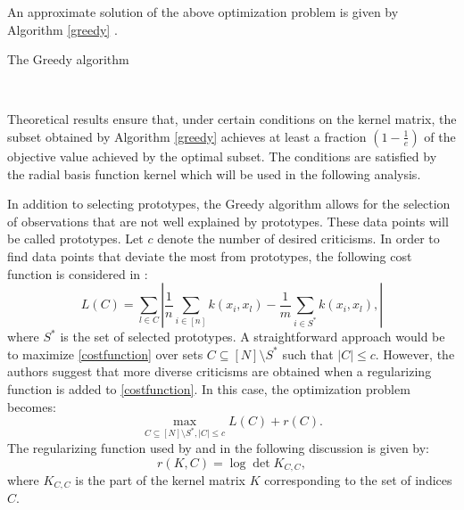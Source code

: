 \documentclass{article}
\begin{document}
	
	An approximate solution of the above optimization problem is given by Algorithm \ref{greedy} .
	
	\begin{algorithm}
		\caption{The Greedy algorithm }\label{greedy}
		\begin{algorithmic}[1]
			\EndFor
			\EndWhile \\
		\end{algorithmic}
	\end{algorithm}
	
	Theoretical results \cite{nemhauser1978analysis} ensure that, under certain conditions on the kernel matrix, the subset obtained by Algorithm \ref{greedy} achieves at least a fraction $(1-\frac{1}{e})$ of the objective value achieved by the optimal subset. The conditions are satisfied by the radial basis function kernel which will be used in the following analysis.
	
	In addition to selecting prototypes, the Greedy algorithm allows for the selection of observations that are not well explained by prototypes. These data points will be called prototypes. Let $c$ denote the number of desired criticisms. In order to find data points that deviate the most from prototypes, the following cost function is   considered in \cite{kim}:
	\begin{equation}\label{costfunction}
	L(C) = \sum_{l \in C}\left| \frac{1}{n}\sum_{i \in \left[ n \right]}k(x_i, x_l) - \frac{1}{m}\sum_{i \in S^{*}}k(x_i, x_l), \right|
	\end{equation}
	where $S^{*}$ is the set of selected prototypes.
	A straightforward approach would be to maximize \ref{costfunction} over sets $C\subseteq [N]\setminus S^{*}$ such that $|C|\leq c$. However, the authors suggest that more diverse criticisms are obtained when a regularizing function is added to \ref{costfunction}. In this case, the optimization problem becomes:
	$$
	\max_{C\subseteq [N]\setminus S^{*}, |C|\leq c} L(C) + r(C).
	$$
	The regularizing function used by \cite{kim} and in the following discussion is given by:
	$$
	r(K,C) = \log \det K_{C,C},
	$$
	where $K_{C,C}$ is the part of the kernel matrix $K$ corresponding to the set of indices $C$.
	
\end{document}
